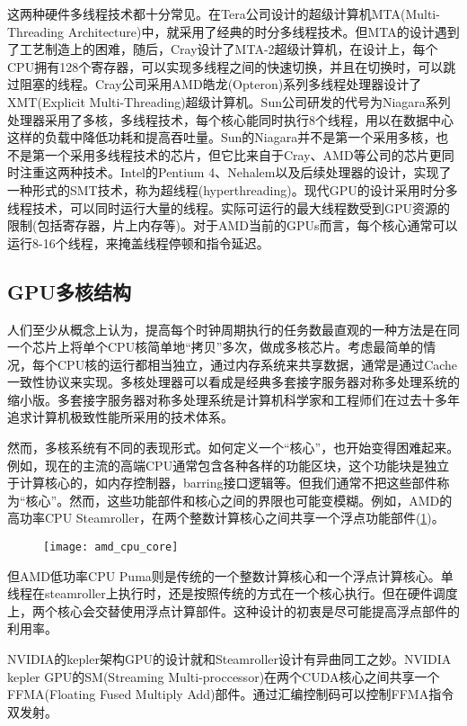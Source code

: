 这两种硬件多线程技术都十分常见。在Tera公司设计的超级计算机MTA(Multi-Threading Architecture)中，就采用了经典的时分多线程技术。但MTA的设计遇到了工艺制造上的困难，随后，Cray设计了MTA-2超级计算机，在设计上，每个CPU拥有128个寄存器，可以实现多线程之间的快速切换，并且在切换时，可以跳过阻塞的线程。Cray公司采用AMD皓龙(Opteron)系列多线程处理器设计了XMT(Explicit Multi-Threading)超级计算机。Sun公司研发的代号为Niagara系列处理器采用了多核，多线程技术，每个核心能同时执行8个线程，用以在数据中心这样的负载中降低功耗和提高吞吐量。Sun的Niagara并不是第一个采用多核，也不是第一个采用多线程技术的芯片，但它比来自于Cray、AMD等公司的芯片更同时注重这两种技术。Intel的Pentium 4、Nehalem以及后续处理器的设计，实现了一种形式的SMT技术，称为超线程(hyperthreading)。现代GPU的设计采用时分多线程技术，可以同时运行大量的线程。实际可运行的最大线程数受到GPU资源的限制(包括寄存器，片上内存等)。对于AMD当前的GPUs而言，每个核心通常可以运行8-16个线程，来掩盖线程停顿和指令延迟。

\subsection{GPU多核结构}
人们至少从概念上认为，提高每个时钟周期执行的任务数最直观的一种方法是在同一个芯片上将单个CPU核简单地“拷贝”多次，做成多核芯片。考虑最简单的情况，每个CPU核的运行都相当独立，通过内存系统来共享数据，通常是通过Cache一致性协议来实现。多核处理器可以看成是经典多套接字服务器对称多处理系统的缩小版。多套接字服务器对称多处理系统是计算机科学家和工程师们在过去十多年追求计算机极致性能所采用的技术体系。

然而，多核系统有不同的表现形式。如何定义一个“核心”，也开始变得困难起来。例如，现在的主流的高端CPU通常包含各种各样的功能区块，这个功能块是独立于计算核心的，如内存控制器，barring接口逻辑等。但我们通常不把这些部件称为“核心”。然而，这些功能部件和核心之间的界限也可能变模糊。例如，AMD的高功率CPU Steamroller，在两个整数计算核心之间共享一个浮点功能部件(\ref{fig:amd_cpu_core})。
\begin{figure}[htbp]
	\centering
	\texttt{[image: amd\_cpu\_core]}
	\label{fig:amd_cpu_core}
\end{figure}

但AMD低功率CPU Puma则是传统的一个整数计算核心和一个浮点计算核心。单线程在steamroller上执行时，还是按照传统的方式在一个核心执行。但在硬件调度上，两个核心会交替使用浮点计算部件。这种设计的初衷是尽可能提高浮点部件的利用率。

NVIDIA的kepler架构GPU的设计就和Steamroller设计有异曲同工之妙。NVIDIA kepler GPU的SM(Streaming Multi-proccessor)在两个CUDA核心之间共享一个FFMA(Floating Fused Multiply Add)部件。通过汇编控制码可以控制FFMA指令双发射。

